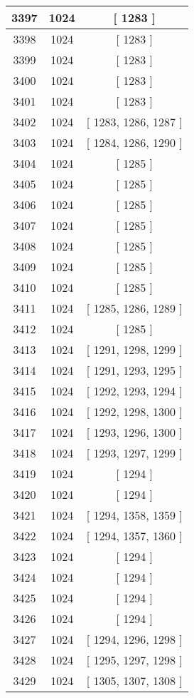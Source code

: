 \begin{center}
\begin{longtable}[H]{|| c c c ||}
\hline
3397 & 1024 & [ 1283 ] \\ 
\hline
3398 & 1024 & [ 1283 ] \\ 
\hline
3399 & 1024 & [ 1283 ] \\ 
\hline
3400 & 1024 & [ 1283 ] \\ 
\hline
3401 & 1024 & [ 1283 ] \\ 
\hline
3402 & 1024 & [ 1283, 1286, 1287 ] \\ 
\hline
3403 & 1024 & [ 1284, 1286, 1290 ] \\ 
\hline
3404 & 1024 & [ 1285 ] \\ 
\hline
3405 & 1024 & [ 1285 ] \\ 
\hline
3406 & 1024 & [ 1285 ] \\ 
\hline
3407 & 1024 & [ 1285 ] \\ 
\hline
3408 & 1024 & [ 1285 ] \\ 
\hline
3409 & 1024 & [ 1285 ] \\ 
\hline
3410 & 1024 & [ 1285 ] \\ 
\hline
3411 & 1024 & [ 1285, 1286, 1289 ] \\ 
\hline
3412 & 1024 & [ 1285 ] \\ 
\hline
3413 & 1024 & [ 1291, 1298, 1299 ] \\ 
\hline
3414 & 1024 & [ 1291, 1293, 1295 ] \\ 
\hline
3415 & 1024 & [ 1292, 1293, 1294 ] \\ 
\hline
3416 & 1024 & [ 1292, 1298, 1300 ] \\ 
\hline
3417 & 1024 & [ 1293, 1296, 1300 ] \\ 
\hline
3418 & 1024 & [ 1293, 1297, 1299 ] \\ 
\hline
3419 & 1024 & [ 1294 ] \\ 
\hline
3420 & 1024 & [ 1294 ] \\ 
\hline
3421 & 1024 & [ 1294, 1358, 1359 ] \\ 
\hline
3422 & 1024 & [ 1294, 1357, 1360 ] \\ 
\hline
3423 & 1024 & [ 1294 ] \\ 
\hline
3424 & 1024 & [ 1294 ] \\ 
\hline
3425 & 1024 & [ 1294 ] \\ 
\hline
3426 & 1024 & [ 1294 ] \\ 
\hline
3427 & 1024 & [ 1294, 1296, 1298 ] \\ 
\hline
3428 & 1024 & [ 1295, 1297, 1298 ] \\ 
\hline
3429 & 1024 & [ 1305, 1307, 1308 ] \\ 

\end{longtable}
\end{center}
